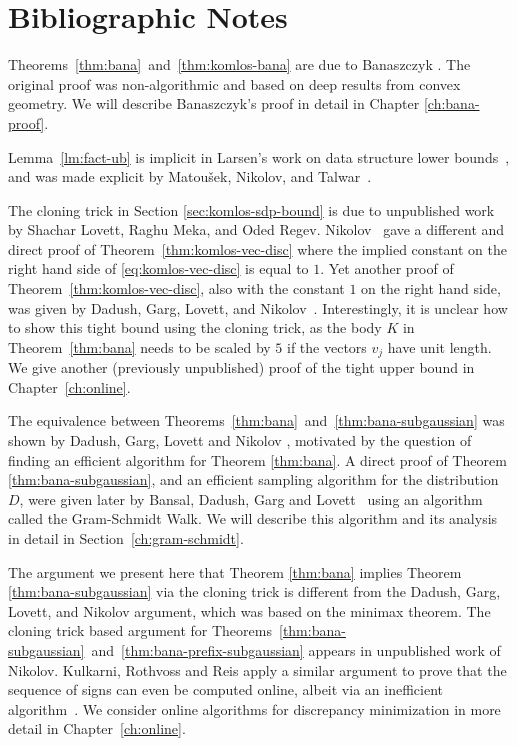 \section{Bibliographic Notes}

Theorems~\ref{thm:bana}~and~\ref{thm:komlos-bana} are due to Banaszczyk \cite{Bana98}. The
original proof was non-algorithmic and based on deep results from convex geometry. We will describe Banaszczyk's proof in detail in
Chapter \ref{ch:bana-proof}. 

Lemma~\ref{lm:fact-ub} is implicit in Larsen's work on data structure
lower bounds~\cite{disc-larsen}, and was made explicit by
Matou\v{s}ek, Nikolov, and Talwar~\cite{MNT}. 

The cloning trick in Section \ref{sec:komlos-sdp-bound} is due to
unpublished work by Shachar Lovett, Raghu Meka, and Oded
Regev. Nikolov~\cite{nikolov2013komlos} gave a different and direct proof of
Theorem~\ref{thm:komlos-vec-disc} where the implied constant on the
right hand side of \eqref{eq:komlos-vec-disc} is equal to $1$. Yet another proof of Theorem~\ref{thm:komlos-vec-disc}, also with the constant $1$ on the right hand side, was given by Dadush, Garg, Lovett, and Nikolov~\cite{DGLN16}.
Interestingly, it is unclear how to show this tight
bound using the cloning trick, as the body $K$ in
Theorem~\ref{thm:bana} needs to be scaled by $5$ if the vectors $v_j$
have unit length. We give another (previously unpublished) proof of the tight upper bound in Chapter~\ref{ch:online}.

The equivalence between
Theorems~\ref{thm:bana}~and~\ref{thm:bana-subgaussian} was shown by
Dadush, Garg, Lovett and Nikolov \cite{DGLN16}, motivated by the
question of finding an efficient algorithm for Theorem
\ref{thm:bana}. A direct proof of Theorem \ref{thm:bana-subgaussian},
and an efficient sampling algorithm for the distribution $D$, were given
later by Bansal, Dadush, Garg and Lovett~\cite{BansalDGL19} using an algorithm called the Gram-Schmidt Walk. We will
describe this algorithm and its analysis in detail in Section~\ref{ch:gram-schmidt}.

The argument we present here that Theorem \ref{thm:bana} implies
Theorem \ref{thm:bana-subgaussian} via the cloning trick is
different from the Dadush, Garg, Lovett, and Nikolov argument, which
was based on the minimax theorem.  The cloning trick based argument
for
Theorems~\ref{thm:bana-subgaussian}~and~\ref{thm:bana-prefix-subgaussian}
appears in unpublished work of Nikolov. Kulkarni, Rothvoss and Reis
apply a similar argument to prove that the sequence of signs can even
be computed online, albeit via an inefficient
algorithm~\cite{rothvoss-online}. We consider online algorithms for
discrepancy minimization in more detail in Chapter~\ref{ch:online}.

